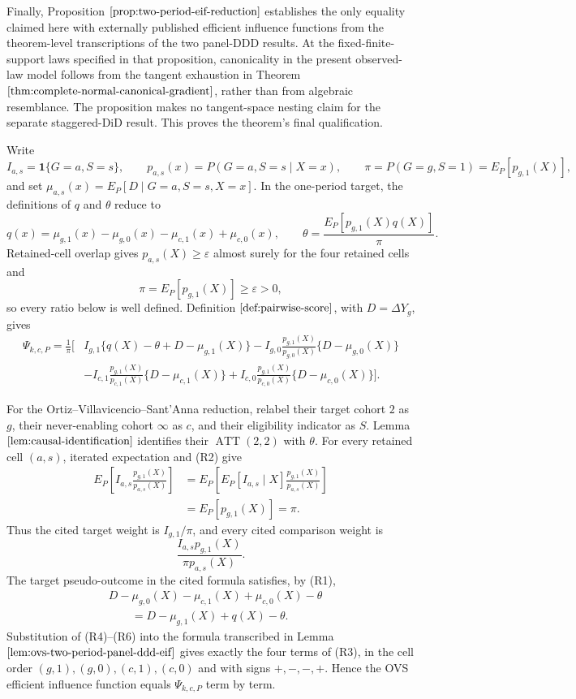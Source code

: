 Finally, Proposition \(\ref{prop:two-period-eif-reduction}\) establishes the only equality claimed here with externally published efficient influence functions from the theorem-level transcriptions of the two panel-DDD results.  At the fixed-finite-support laws specified in that proposition, canonicality in the present observed-law model follows from the tangent exhaustion in Theorem \(\ref{thm:complete-normal-canonical-gradient}\), rather than from algebraic resemblance.  The proposition makes no tangent-space nesting claim for the separate staggered-DiD result.  This proves the theorem's final qualification.

Write
\[
I_{a,s}=\mathbf 1\{G=a,S=s\},\qquad
p_{a,s}(x)=P(G=a,S=s\mid X=x),\qquad
\pi=P(G=g,S=1)=E_P[p_{g,1}(X)],
\]
and set \(\mu_{a,s}(x)=E_P[D\mid G=a,S=s,X=x]\).  In the one-period target, the definitions of \(q\) and \(\theta\) reduce to
\[
q(x)=\mu_{g,1}(x)-\mu_{g,0}(x)-\mu_{c,1}(x)+\mu_{c,0}(x),
\qquad
\theta=\frac{E_P[p_{g,1}(X)q(X)]}{\pi}.
\tag{R1}
\]
Retained-cell overlap gives \(p_{a,s}(X)\ge\varepsilon\) almost surely for the four retained cells and
\[
\pi=E_P[p_{g,1}(X)]\ge\varepsilon>0,
\tag{R2}
\]
so every ratio below is well defined.  Definition \(\ref{def:pairwise-score}\), with \(D=\Delta Y_g\), gives
\[
\begin{aligned}
\Psi_{k,c,P}
=\frac1\pi\bigg[&I_{g,1}\{q(X)-\theta+D-\mu_{g,1}(X)\}
-I_{g,0}\frac{p_{g,1}(X)}{p_{g,0}(X)}\{D-\mu_{g,0}(X)\}\\
&-I_{c,1}\frac{p_{g,1}(X)}{p_{c,1}(X)}\{D-\mu_{c,1}(X)\}
+I_{c,0}\frac{p_{g,1}(X)}{p_{c,0}(X)}\{D-\mu_{c,0}(X)\}\bigg].
\end{aligned}
\tag{R3}
\]

For the Ortiz--Villavicencio--Sant'Anna reduction, relabel their target cohort \(2\) as \(g\), their never-enabling cohort \(\infty\) as \(c\), and their eligibility indicator as \(S\).  Lemma \(\ref{lem:causal-identification}\) identifies their \(\operatorname{ATT}(2,2)\) with \(\theta\).  For every retained cell \((a,s)\), iterated expectation and (R2) give
\[
\begin{aligned}
E_P\!\left[I_{a,s}\frac{p_{g,1}(X)}{p_{a,s}(X)}\right]
&=E_P\!\left[E_P[I_{a,s}\mid X]
\frac{p_{g,1}(X)}{p_{a,s}(X)}\right]\\
&=E_P[p_{g,1}(X)]=\pi.
\end{aligned}
\tag{R4}
\]
Thus the cited target weight is \(I_{g,1}/\pi\), and every cited comparison weight is
\[
\frac{I_{a,s}p_{g,1}(X)}{\pi p_{a,s}(X)}.
\tag{R5}
\]
The target pseudo-outcome in the cited formula satisfies, by (R1),
\[
\begin{aligned}
&D-\mu_{g,0}(X)-\mu_{c,1}(X)+\mu_{c,0}(X)-\theta\\
&\qquad=D-\mu_{g,1}(X)+q(X)-\theta.
\end{aligned}
\tag{R6}
\]
Substitution of (R4)--(R6) into the formula transcribed in Lemma \(\ref{lem:ovs-two-period-panel-ddd-eif}\) gives exactly the four terms of (R3), in the cell order \((g,1),(g,0),(c,1),(c,0)\) and with signs \(+,-,-,+\).  Hence the OVS efficient influence function equals \(\Psi_{k,c,P}\) term by term.

